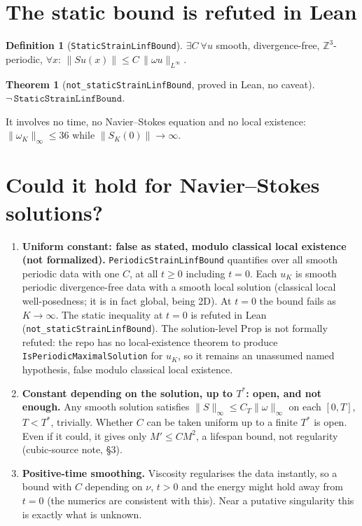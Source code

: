 \documentclass[11pt]{article}
\newtheorem{theorem}{Theorem}\newtheorem{proposition}{Proposition}
\theoremstyle{definition}\newtheorem{definition}{Definition}
\begin{document}
\section{The static bound is refuted in Lean}
\begin{definition}[\texttt{StaticStrainLinfBound}]
$\exists C\ \forall u$ smooth, divergence-free, $\mathbb{Z}^3$-periodic, $\forall x$: $\|S u(x)\|\le C\,\|\omega u\|_{L^\infty}$.
\end{definition}
\begin{theorem}[\texttt{not\_staticStrainLinfBound}, proved in Lean, no caveat]
$\neg\,\texttt{StaticStrainLinfBound}$.
\end{theorem}
\noindent It involves no time, no Navier--Stokes equation and no local existence: $\|\omega_K\|_\infty\le36$ while $\|S_K(0)\|\to\infty$.

\section{Could it hold for Navier--Stokes solutions?}
\begin{enumerate}
\item \textbf{Uniform constant: false as stated, modulo classical local existence (not formalized).} \texttt{PeriodicStrainLinfBound} quantifies over all smooth periodic data with one $C$, at all $t\ge0$ including $t=0$. Each $u_K$ is smooth periodic divergence-free data with a smooth local solution (classical local well-posedness; it is in fact global, being 2D). At $t=0$ the bound fails as $K\to\infty$. The static inequality at $t=0$ is refuted in Lean (\texttt{not\_staticStrainLinfBound}). The solution-level Prop is not formally refuted: the repo has no local-existence theorem to produce \texttt{IsPeriodicMaximalSolution} for $u_K$, so it remains an unassumed named hypothesis, false modulo classical local existence.
\item \textbf{Constant depending on the solution, up to $T^*$: open, and not enough.} Any smooth solution satisfies $\|S\|_\infty\le C_T\|\omega\|_\infty$ on each $[0,T]$, $T<T^*$, trivially. Whether $C$ can be taken uniform up to a finite $T^*$ is open. Even if it could, it gives only $M'\le CM^2$, a lifespan bound, not regularity (cubic-source note, \S3).
\item \textbf{Positive-time smoothing.} Viscosity regularises the data instantly, so a bound with $C$ depending on $\nu$, $t>0$ and the energy might hold away from $t=0$ (the numerics are consistent with this). Near a putative singularity this is exactly what is unknown.
\end{enumerate}
\end{document}
